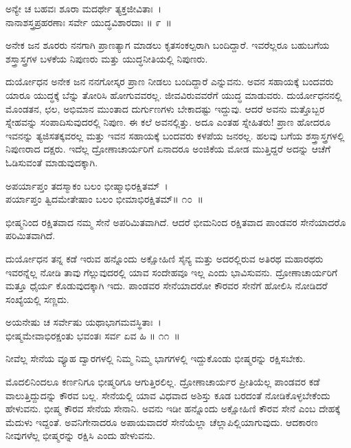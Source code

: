 \begin{shloka}
ಅನ್ಯೇ ಚ ಬಹವಃ ಶೂರಾ ಮದರ್ಥೇ ತ್ಯಕ್ತಜೀವಿತಾಃ~।\\ನಾನಾಶಸ್ತ್ರಪ್ರಹರಣಾಃ ಸರ್ವೇ ಯುದ್ಧವಿಶಾರದಾಃ \hfill॥ ೯~॥
\end{shloka}

\begin{artha}
ಅನೇಕ ಜನ ಶೂರರು ನನಗಾಗಿ ಪ್ರಾಣತ್ಯಾಗ ಮಾಡಲು ಕೃತಸಂಕಲ್ಪರಾಗಿ ಬಂದಿದ್ದಾರೆ. ಇವರೆಲ್ಲರೂ ಬಹುಬಗೆಯ ಶಸ್ತ್ರಾಸ್ತ್ರಗಳ ಬಳಕೆಯ ನಿಪುಣರು ಮತ್ತು ಯುದ್ಧನೀತಿಯಲ್ಲಿ ನಿಪುಣರು.
\end{artha}

ದುರ್ಯೋಧನ ಅನೇಕ ಜನ ನನಗೋಸ್ಕರ ಪ್ರಾಣ ನೀಡಲು ಬಂದಿದ್ದಾರೆ ಎನ್ನುವನು. ಅವನ ಸಹಾಯಕ್ಕೆ ಬಂದವರು ಯಾರೂ ಯುದ್ಧಕ್ಕೆ ಬೆನ್ನು ತೋರಿಸಿ ಹೋಗುವವರಲ್ಲ. ಜೀವವಿರುವವರೆಗೆ ಯುದ್ಧ ಮಾಡುವರು. ದುರ್ಯೋಧನನಲ್ಲಿ ಮೊಂಡತನ, ಛಲ, ಅಭಿಮಾನ ಮುಂತಾದ ದುರ್ಗುಣಗಳು ಬೇಕಾದಷ್ಟು ಇದ್ದುವು. ಆದರೆ ಅವನು ಮತ್ತೊಬ್ಬರ ಸ್ನೇಹವನ್ನು ಸಂಪಾದಿಸುವುದರಲ್ಲಿ ನಿಪುಣ. ಈ ಕಲೆ ಅವನಲ್ಲಿತ್ತು. ಅದೂ ಎಂತಹ ಸ್ನೇಹಿತರು! ಪ್ರಾಣ ಹೋದರೂ ಇವನನ್ನು ತ್ಯಜಿಸತಕ್ಕವರಲ್ಲ ಮತ್ತು ಇವನ ಸಹಾಯಕ್ಕೆ ಬಂದವರು ಕಳಪೆಯ ಜನರಲ್ಲ. ಹಲವು ಬಗೆಯ ಶಸ್ತ್ರಾಸ್ತ್ರಗಳಲ್ಲಿ ನಿಪುಣರಾದ ದಕ್ಷರು. ಇದೆಲ್ಲ ದ್ರೋಣಾಚಾರ್ಯರಿಗೆ ಏನಾದರೂ ಅಂಜಿಕೆಯ ಮೋಡ ಮುತ್ತಿದ್ದರೆ ಅದನ್ನು ಆಚೆಗೆ ಓಡಿಸುವಂತೆ ಮಾಡುವುದಕ್ಕಾಗಿ.

\begin{shloka}
ಅಪರ್ಯಾಪ್ತಂ ತದಸ್ಮಾಕಂ ಬಲಂ ಭೀಷ್ಮಾಭಿರಕ್ಷಿತಮ್~।\\ಪರ್ಯಾಪ್ತಂ ತ್ವಿದಮೇತೇಷಾಂ ಬಲಂ ಭೀಮಾಭಿರಕ್ಷಿತಮ್\hfill॥ ೧೦~॥
\end{shloka}

\begin{artha}
ಭೀಷ್ಮನಿಂದ ರಕ್ಷಿತವಾದ ನಮ್ಮ ಸೇನೆ ಅಪರಿಮಿತವಾಗಿದೆ. ಆದರೆ ಭೀಮನಿಂದ ರಕ್ಷಿತವಾದ ಪಾಂಡವರ ಸೇನೆಯಾದರೊ ಪರಿಮಿತವಾಗಿದೆ.
\end{artha}

\newpage

ದುರ್ಯೋಧನ ತನ್ನ ಕಡೆ ಇರುವ ಹನ್ನೊಂದು ಅಕ್ಷೋಹಿಣಿ ಸೈನ್ಯ ಮತ್ತು ಅದರಲ್ಲಿರುವ ಅತಿರಥ ಮಹಾರಥರು ಇವರನ್ನೆಲ್ಲ ನೋಡಿ ತಾವು ಗೆಲ್ಲುವುದರಲ್ಲಿ ಯಾವ ಸಂದೇಹವೂ ಇಲ್ಲ ಎಂದು ಭಾವಿಸುವನು. ದ್ರೋಣಾಚಾರ್ಯರಿಗೆ ಮತ್ತೂ ಧೈರ್ಯ ಕೊಡುವುದಕ್ಕಾಗಿ ಇದು. ಪಾಂಡವರ ಸೇನೆಯಾದರೋ ಕೌರವರ ಸೇನೆಗೆ ಹೋಲಿಸಿ ನೋಡಿದರೆ ಸಂಖ್ಯೆಯಲ್ಲಿ ಸಣ್ಣದು.

\begin{shloka}
ಅಯನೇಷು ಚ ಸರ್ವೇಷು ಯಥಾಭಾಗಮವಸ್ಥಿತಾಃ~।\\ಭೀಷ್ಮಮೇವಾಭಿರಕ್ಷಂತು ಭವಂತಃ ಸರ್ವ ಏವ ಹಿ \hfill॥ ೧೧~॥
\end{shloka}

\begin{artha}
ನೀವೆಲ್ಲ ಸೇನೆಯ ವ್ಯೂಹ ದ್ವಾರಗಳಲ್ಲಿ ನಿಮ್ಮ ನಿಮ್ಮ ಭಾಗಗಳಲ್ಲಿ ಇದ್ದುಕೊಂಡು ಭೀಷ್ಮರನ್ನು ರಕ್ಷಿಸಬೇಕು.
\end{artha}

ಮೊದಲಿನಿಂದಲೂ ಕರ್ಣನಿಗೂ ಭೀಷ್ಮರಿಗೂ ಆಗುತ್ತಿರಲಿಲ್ಲ. ದ್ರೋಣಾಚಾರ್ಯರ ಪ್ರೀತಿ\-ಯೆಲ್ಲ ಪಾಂಡವರ ಕಡೆ ವಾಲುತ್ತಿದ್ದುದನ್ನು ಕೌರವ ಬಲ್ಲ. ಸೇನೆಯಲ್ಲಿ ಯಾವ ವಿಧವಾದ ಅಶಿಸ್ತು ಕೂಡ ಬರದಂತೆ ನೋಡಿಕೊಳ್ಳಬೇಕೆಂದು ಹೇಳುವನು. ಭೀಷ್ಮ ಕೌರವ ಸೇನೆಯ ಸೇನಾನಿ. ಅವನು ಇಡೀ ಹನ್ನೊಂದು ಅಕ್ಷೋಹಿಣಿ ಕೌರವ ಸೇನೆ ಎಂಬ ದೇಹಕ್ಕೆ ಮೆದುಳು ಇದ್ದಂತೆ. ಅವನಿಗೇನಾದರೂ ಅಪಾಯವಾದರೆ ಸೇನೆಯೆಲ್ಲಾ ಚೆಲ್ಲಾಪಿಲ್ಲಿಯಾಗುವುದು. ಆದಕಾರಣ ನೀವುಗಳೆಲ್ಲ ಭೀಷ್ಮರನ್ನು ರಕ್ಷಿಸಿ ಎಂದು ಹೇಳುವನು.

